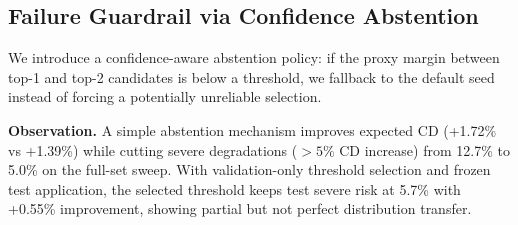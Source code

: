 \subsection{Failure Guardrail via Confidence Abstention}
\label{sec:guardrail-abstain}

We introduce a confidence-aware abstention policy: if the proxy margin between top-1 and top-2 candidates is below a threshold, we fallback to the default seed instead of forcing a potentially unreliable selection.



\noindent\textbf{Observation.}
A simple abstention mechanism improves expected CD (+1.72\% vs +1.39\%) while cutting severe degradations ($>5\%$ CD increase) from 12.7\% to 5.0\% on the full-set sweep. With validation-only threshold selection and frozen test application, the selected threshold keeps test severe risk at 5.7\% with +0.55\% improvement, showing partial but not perfect distribution transfer.
